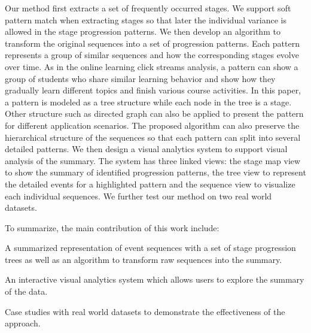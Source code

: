 Our method first extracts a set of frequently occurred stages. We support soft pattern match when extracting stages so that later the individual variance is allowed in the stage progression patterns. We then develop an algorithm to transform the original sequences into a set of progression patterns. Each pattern represents a group of similar sequences and how the corresponding stages evolve over time. As in the online learning click streams analysis, a pattern can show a group of students who share similar learning behavior and show how they gradually learn different topics and finish various course activities. In this paper, a pattern is modeled as a tree structure while each node in the tree is a stage. Other structure such as directed graph can also be applied to present the pattern for different application scenarios. The proposed algorithm can also preserve the hierarchical structure of the sequences so that each pattern can split into several detailed patterns. We then design a visual analytics system to support visual analysis of the summary. The system has three linked views: the stage map view to show the summary of identified progression patterns, the tree view to represent the detailed events for a highlighted pattern and the sequence view to visualize each individual sequences. We further test our method on two real world datasets. 

To summarize, the main contribution of this work include: 
\begin{compactitem}
	\item A summarized representation of event sequences with a set of stage progression trees as well as an algorithm to transform raw sequences into the summary.
	\item An interactive visual analytics system which allows users to explore the summary of the data.
	\item Case studies with real world datasets to demonstrate the effectiveness of the approach.
\end{compactitem}




